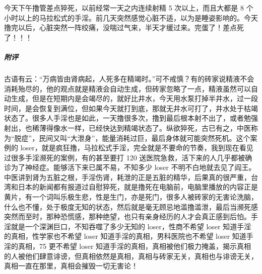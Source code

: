 \begin{case}
    今天下午撸管差点猝死，以前经常一天之内连续射精 5 次以上，而且大都是 8 个小时以上的马拉松式的手淫。前几天突然感觉心脏不适，以为是睡姿影响的。今天撸完以后，心脏突然一阵绞痛，没喘过气来，半天才缓过来。完蛋了！差点死了！！！
    \subparagraph{附评} 古语有云：“万病皆由肾病起，人死多在精竭时。”可不戒慎？有的砖家说精液不会消耗殆尽的，他的观点就是精液会自动生成，但砖家忽略了一点，精液虽然可以自动生成，但是在短期内是会竭尽的，就好比井水，今天用水泵打掉半井水，过一段时间，是会恢复到满位，但如果今天就打到底，那就无井水可打了，井水处于枯竭状态了。很多人手淫也是如此，一天撸很多次，撸到最后根本射不出了，或者勉强射出，也稀薄得像水一样，已经快达到精竭状态了。纵欲猝死，古已有之，中医称为“脱症”，民间又叫“大泄身”，能量消耗过巨，最后身体就可能突然死机。这个案例的 loser，就是疯狂撸，马拉松式手淫，完全就是不要命的节奏，我到现在看见过很多手淫濒死的案例，有的甚至要打 120 送医院急救，活下来的人几乎都被确诊为了神经症。能够活下来已属不易，不知多少 loser 不明不白地就去见了阎王。中医讲到肾为五脏之根，手淫伤肾，耗泄的正是五脏的精华，后果真的很严重，台湾和日本的新闻都有报道过自慰猝死，就是撸死在电脑前，电脑里播放的内容正是黄片，有一个词叫乐极生悲，性是生门，亦是死门，很多人被砖家的无害论洗脑，什么也不懂，处于极度无知的状态，然后就是毫无顾忌地滥撸滥泄，最后当濒死感突然而至时，那种恐慌感，那种绝望，也只有亲身经历的人才会真正感到后怕。手淫就是一个深渊巨口，不知吞噬了多少无知的 loser，性商不希望 loser 知道手淫的真相，性学家也不希望 loser 知道手淫的真相，男科医院也不希望 loser 知道手淫的真相，75 更不希望 loser 知道手淫的真相，真相被他们极力掩盖，揭示真相的人被他们肆意诽谤，但真相依然是真相，真相与砖家无关，真相也与诽谤无关，真相一直在那里，真相会摧毁一切无害论！
\end{case}

